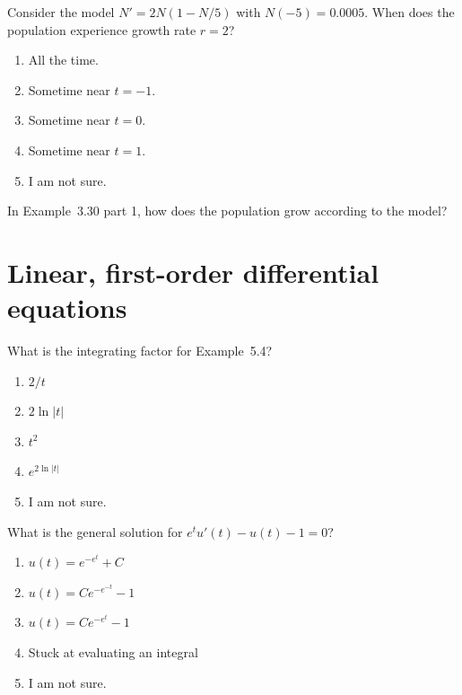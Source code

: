 \documentclass[aspectratio=169, t, 14pt]{beamer}
\begin{document}
\begin{poll}
  Consider the model \(N' = 2 N(1 - N/5)\) with \(N(-5) = 0.0005\). When does the population experience growth rate \(r = 2\)?

  \begin{enumerate}
    \item All the time.
    \item Sometime near \(t = -1\).
    \item Sometime near \(t = 0\).
    \item Sometime near \(t = 1\).
    \item I am not sure.
  \end{enumerate}
\end{poll}

\begin{frame}
  In Example~3.30 part 1, how does the population grow according to the model?

\end{frame}

\section{Linear, first-order differential equations}

\begin{frame}
  What is the integrating factor for Example~5.4?

  \begin{enumerate}
    \item \(2/t\)
    \item \(2\ln|t|\)
    \item \(t^{2}\)
    \item \(e^{2\ln|t|}\)
    \item I am not sure. 
  \end{enumerate}
\end{frame}

\begin{frame}[c]
  What is the general solution for \(e^{t}u'(t) - u(t) - 1 = 0\)?

  \begin{enumerate}
    \item \(u(t) = e^{-e^{t}} + C\)
    \item \(u(t) = Ce^{-e^{-t}} - 1\)
    \item \(u(t) = Ce^{-e^{t}} - 1\)
    \item Stuck at evaluating an integral
    \item I am not sure.
  \end{enumerate}
\end{frame}
\end{document}

